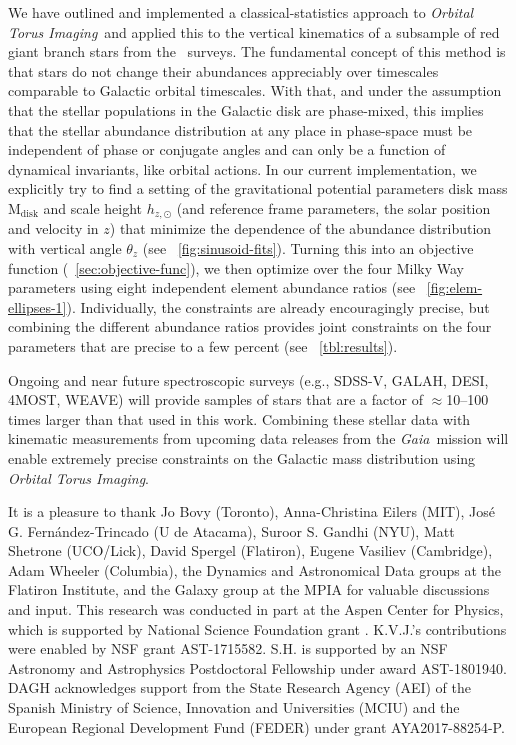 \documentclass[modern]{aastex63}
\newcommand{\methodname}{\textsl{Orbital Torus Imaging}}
\newcommand{\gaia}{\textsl{Gaia}}
\newcommand{\apogee}{\acronym{APOGEE}}
\newcommand{\mdisk}{\ensuremath{\mathrm{M}_\mathrm{disk}}}
\newcommand{\hz}{\ensuremath{h_{z, \odot}}}
\begin{document}
We have outlined and implemented a classical-statistics approach to \methodname\
and applied this to the vertical kinematics of a subsample of red giant branch
stars from the \apogee\ surveys.
The fundamental concept of this method is that stars do not change their
abundances appreciably over timescales comparable to Galactic orbital
timescales.
With that, and under the assumption that the stellar populations in the Galactic
disk are phase-mixed, this implies that the stellar abundance distribution at
any place in phase-space must be independent of phase or conjugate angles and
can only be a function of dynamical invariants, like orbital actions.
In our current implementation, we explicitly try to find a setting of the
gravitational potential parameters disk mass $\mdisk$ and scale height $\hz$
(and reference frame parameters, the solar position and velocity in $z$) that
minimize the dependence of the abundance distribution with vertical angle
$\theta_z$ (see \figurename~\ref{fig:sinusoid-fits}).
Turning this into an objective function (\sectionname~\ref{sec:objective-func}),
we then optimize over the four Milky Way parameters using eight independent
element abundance ratios (see \figurename~\ref{fig:elem-ellipses-1}).
Individually, the constraints are already encouragingly precise, but combining
the different abundance ratios provides joint constraints on the four parameters
that are precise to a few percent (see \tablename~\ref{tbl:results}).

Ongoing and near future spectroscopic surveys (e.g., SDSS-V, GALAH, DESI, 4MOST,
WEAVE) will provide samples of stars that are a factor of $\approx$10--100
times larger than that used in this work.
Combining these stellar data with kinematic measurements from upcoming data
releases from the \gaia\ mission will enable extremely precise constraints on
the Galactic mass distribution using \methodname.


\acknowledgments
It is a pleasure to thank
  Jo Bovy (Toronto),
  Anna-Christina Eilers (MIT),
  Jos\'e G. Fern\'andez-Trincado (U de Atacama),
  Suroor S. Gandhi (NYU),
  Matt Shetrone (UCO/Lick),
  David Spergel (Flatiron),
  Eugene Vasiliev (Cambridge),
  Adam Wheeler (Columbia),
  the Dynamics and Astronomical Data groups at the Flatiron Institute,
  and the Galaxy group at the MPIA
for valuable discussions and input.
This research was conducted in part at the Aspen Center for Physics,
which is supported by National Science Foundation grant .
K.V.J.'s contributions were enabled by NSF grant AST-1715582.
S.H. is supported by an NSF Astronomy and Astrophysics Postdoctoral Fellowship
under award AST-1801940.
DAGH acknowledges support from the State Research Agency (AEI) of the Spanish
Ministry of Science, Innovation and Universities (MCIU) and the European
Regional Development Fund (FEDER) under grant AYA2017-88254-P.
\end{document}
